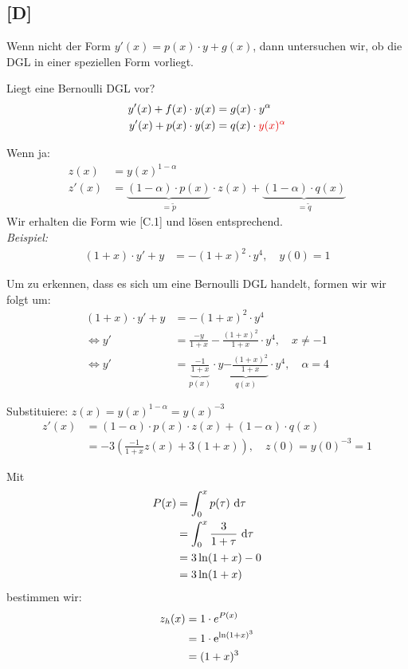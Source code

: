 \documentclass[main.tex]{subfiles}
\begin{document}
\subsection{[D]}
Wenn nicht der Form $y'(x) = p(x)\cdot y + g(x)$, dann untersuchen wir, ob die DGL in einer speziellen Form vorliegt.

Liegt eine Bernoulli DGL vor?
\begin{align*}
	y'(x) + f(x)\cdot y(x) &= g(x)\cdot y^\alpha \\
	y'(x) + p(x)\cdot y(x) &= q(x)\cdot \textcolor{red}{y(x)^\alpha}
\end{align*}

Wenn ja: 
\begin{align*}
	z(x)  &= y(x)^{1-\alpha} \\
	z'(x) &= \underbrace{(1-\alpha)\cdot p(x)}_{= \tilde{p}}\cdot z(x) + \underbrace{(1-\alpha)\cdot q(x)}_{= \tilde{q}}	
\end{align*}
Wir erhalten die Form wie [C.1] und lösen entsprechend.\\

\textit{Beispiel:}
\begin{align*}
	(1+x)\cdot y' + y &= - (1+x)^2\cdot y^4, \quad y(0) = 1
\end{align*}

Um zu erkennen, dass es sich um eine Bernoulli DGL handelt, formen wir wir folgt um: 
\begin{align*}
	(1+x)\cdot y' + y &= - (1+x)^2\cdot y^4 \\
\Leftrightarrow	y' &= \frac{-y}{1+x} - \frac{(1+x)^2}{1+x} \cdot y^4, \quad x\neq -1 \\
\Leftrightarrow	y' &= \underbrace{\frac{-1}{1+x}}_{p(x)} \cdot y \underbrace{- \frac{(1+x)^2}{1+x}}_{q(x)} \cdot y^4, \quad \alpha = 4
\end{align*}

Substituiere: $z(x) = y(x)^{1-\alpha} = y(x)^{-3}$
\begin{align*}
	z'(x) &= (1-\alpha)\cdot p(x) \cdot z(x) + (1-\alpha)\cdot q(x)\\
		  &= -3(\frac{-1}{1+x} z(x) +3 (1+x)), \quad z(0)=y(0)^{-3}=1
\end{align*}

Mit
\begin{align*}
	P(x) &= \int^x_0 p(\tau) ~\mathrm{d}\tau\\
	&= \int^x_0 \frac{3}{1+\tau}~\mathrm{d}\tau\\
	&= 3\ln(1+x) - 0 \\
	&= 3\ln(1+x)
\end{align*}
bestimmen wir:
\begin{align*}
	z_h(x) &= 1\cdot e^{P(x)} \\
		   &= 1\cdot \mathrm{e}^{\ln(1+x)^3} \\
		   &= (1+x)^3
\end{align*}
\end{document}
